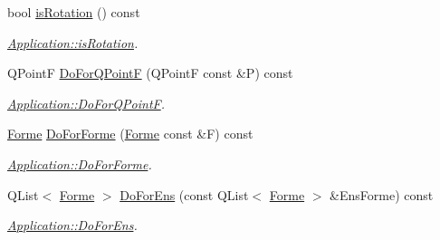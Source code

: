 \begin{DoxyCompactItemize}
bool \hyperlink{class_application_a1803286658b5d45285249d26d2769421}{is\+Rotation} () const 
\begin{DoxyCompactList}\small\item\em \hyperlink{class_application_a1803286658b5d45285249d26d2769421}{Application\+::is\+Rotation}. \end{DoxyCompactList}\item 
Q\+Point\+F \hyperlink{class_application_aa56c9ed2f93b4c07ef216640306798bf}{Do\+For\+Q\+Point\+F} (Q\+Point\+F const \&P) const 
\begin{DoxyCompactList}\small\item\em \hyperlink{class_application_aa56c9ed2f93b4c07ef216640306798bf}{Application\+::\+Do\+For\+Q\+Point\+F}. \end{DoxyCompactList}\item 
\hyperlink{class_forme}{Forme} \hyperlink{class_application_ae7180fb4ac871614e75a09abbec7fc98}{Do\+For\+Forme} (\hyperlink{class_forme}{Forme} const \&F) const 
\begin{DoxyCompactList}\small\item\em \hyperlink{class_application_ae7180fb4ac871614e75a09abbec7fc98}{Application\+::\+Do\+For\+Forme}. \end{DoxyCompactList}\item 
Q\+List$<$ \hyperlink{class_forme}{Forme} $>$ \hyperlink{class_application_adb1c2b8cfcc50ff0d5b0a69a625dd8de}{Do\+For\+Ens} (const Q\+List$<$ \hyperlink{class_forme}{Forme} $>$ \&Ens\+Forme) const 
\begin{DoxyCompactList}\small\item\em \hyperlink{class_application_adb1c2b8cfcc50ff0d5b0a69a625dd8de}{Application\+::\+Do\+For\+Ens}. \end{DoxyCompactList}\end{DoxyCompactItemize}
